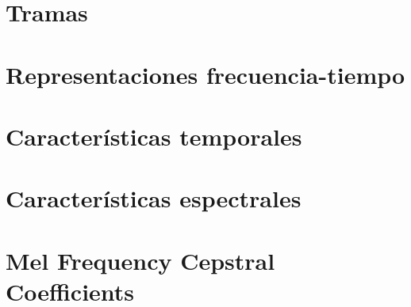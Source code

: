 \section{Tramas}\label{sec:frames}


\section{Representaciones frecuencia-tiempo}\label{sec:representacionesFrecuencia-tiempo}


\section{Características temporales}\label{sec:característicasTemporales}


\section{Características espectrales}\label{sec:característicasEspectrales}


\section{Mel Frequency Cepstral Coefficients}\label{sec:MFCC}

